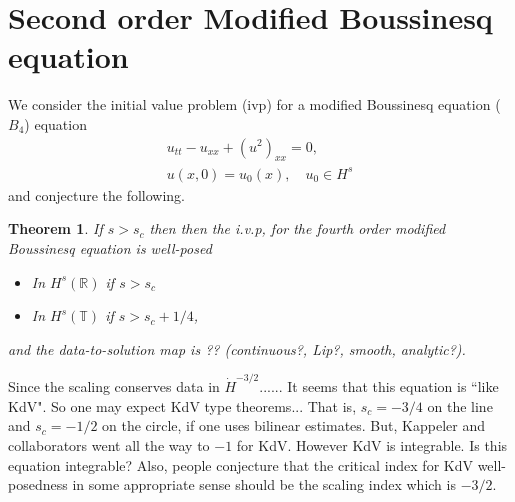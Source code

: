 \documentclass[12pt,reqno]{amsart}
\numberwithin{equation}{section}  %
\numberwithin{figure}{section}
\newcommand{\rr}{\mathbb{R}}
\newcommand{\ci}{\mathbb{T}}
\theoremstyle{plain}
\newtheorem{theorem}{Theorem}
\theoremstyle{definition}
\theoremstyle{remark}
\begin{document}
\section{Second order Modified Boussinesq  equation}
\label{sec:intro}
We consider the initial value problem (ivp) for a modified Boussinesq
equation ($B_4$) equation 
\begin{gather}
  u_{tt} - u_{xx} + (u^2)_{xx} = 0,
  \label{eqn:mb}
  \\
  u(x,0) = u_{0}(x), \quad u_{0} \in H^{s}
  \label{eqn:mb-init-data}
\end{gather}
and conjecture the following.
%
%
%
%
%
%
%
%
\begin{theorem}
  If $s>s_c$ then then the  i.v.p, for the fourth order modified
  Boussinesq  equation is well-posed
  \begin{itemize}
    \item In $H^s(\rr)$ if $s > s_c$
    \item In $H^{s}(\ci)$ if $s > s_c + 1/4$,
  \end{itemize}
  and the data-to-solution map is  ?? (continuous?, Lip?, smooth, analytic?). 
  \label{thm:wp}
\end{theorem}
%
%
%
%
%
Since the scaling conserves data in $\dot{H}^{-3/2}$......
It seems that this equation is ``like KdV".
So one may expect KdV type theorems...
That is, $s_c=-3/4$ on the line and $s_c=-1/2$ on the circle,
if one uses bilinear estimates.
But, Kappeler and collaborators went all the way to $-1$ for KdV.
However KdV is integrable. Is this equation integrable?
Also, people conjecture that the critical index for KdV well-posedness 
in some appropriate sense should be the scaling index which is  $-3/2$.

\newpage
\appendix
\end{document}

